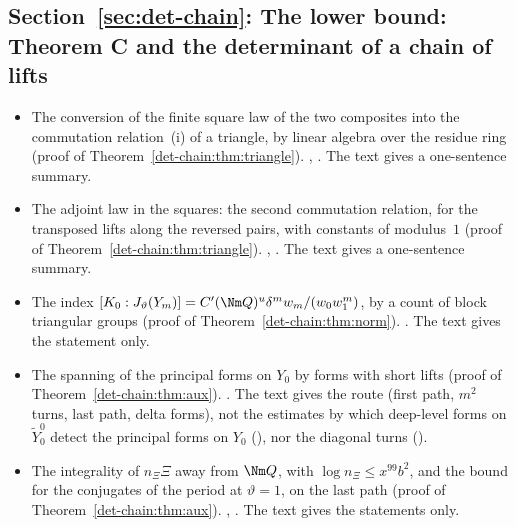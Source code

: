 \subsection*{Section~\ref{sec:det-chain}: The lower bound: Theorem C and the determinant of a chain of lifts}
\begin{itemize}[leftmargin=2em,itemsep=1pt]
\item The conversion of the finite square law of the two composites into the commutation
  relation~(i) of a triangle, by linear algebra over the residue ring (proof of
  Theorem~\ref{det-chain:thm:triangle}). ,
  . The text gives a one-sentence
  summary.
\item The adjoint law in the squares: the second commutation relation, for the transposed lifts
  along the reversed pairs, with constants of modulus~$1$ (proof of
  Theorem~\ref{det-chain:thm:triangle}). ,
  . The text gives a one-sentence summary.
\item The index $[K_0:J_\vartheta(Y_m)]=C'(\Nm Q)^{u}\delta^mw_m/(w_0w_1^m)$, by a count of block
  triangular groups (proof of Theorem~\ref{det-chain:thm:norm}).
  . The text gives the statement only.
\item The spanning of the principal forms on $Y_0$ by forms with short lifts (proof of
  Theorem~\ref{det-chain:thm:aux}). . The text gives
  the route (first path, $m^2$ turns, last path, delta forms), not the estimates by which deep-level
  forms on $\tilde Y^0_0$ detect the principal forms on $Y_0$
  (), nor the diagonal turns
  ().
\item The integrality of $n_\Xi\Xi$ away from $\Nm Q$, with $\log n_\Xi\le x^{99}b^2$, and the bound
  for the conjugates of the period at $\vartheta=1$, on the last path (proof of
  Theorem~\ref{det-chain:thm:aux}). ,
  . The text gives the statements only.
\end{itemize}

